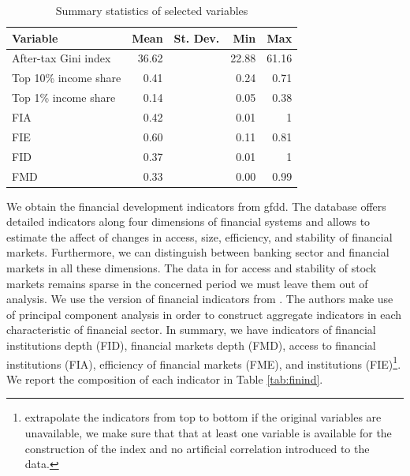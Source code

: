 \documentclass[a4paper,11pt]{article}
\begin{document}
\begin{table}[ht!]
  \small
  \caption{Summary statistics of selected variables}
  \label{tab:ineq}
  \centering
     \begin{tabular}{lrrrr}
      \toprule
      Variable & Mean & St. Dev. & Min & Max \\
      \midrule
      After-tax Gini index  & 36.62 & & 22.88 & 61.16 \\
      Top 10\% income share & 0.41 & & 0.24 & 0.71 \\
      Top 1\% income share & 0.14 & & 0.05 & 0.38 \\
      FIA & 0.42 & & 0.01 & 1 \\
      FIE & 0.60 & & 0.11 & 0.81 \\
      FID & 0.37 & & 0.01 & 1 \\      
      FMD & 0.33 & & 0.00 & 0.99 \\
      \bottomrule
  \end{tabular}
\end{table}

We obtain the financial development indicators from \ac{gfdd}. The database offers detailed indicators along four dimensions of financial systems and allows to estimate the affect of changes in access, size, efficiency, and stability of financial markets. Furthermore, we can distinguish between banking sector and financial markets in all these dimensions. The data in for access and stability of stock markets remains sparse in the concerned period we must leave them out of analysis. We use the version of financial indicators from \cite{svirydzenka2016introducing}. The authors make use of principal component analysis in order to construct aggregate indicators in each characteristic of financial sector. In summary, we have indicators of financial institutions depth (FID), financial markets depth (FMD), access to financial institutions (FIA), efficiency of financial markets (FME), and institutions (FIE)\footnote{\citet{svirydzenka2016introducing} extrapolate the indicators from top to bottom if the original variables are unavailable, we make sure that that at least one variable is available for the construction of the index and no artificial correlation introduced to the data.}. We report the composition of each indicator in Table \ref{tab:finind}. 
\end{document}
